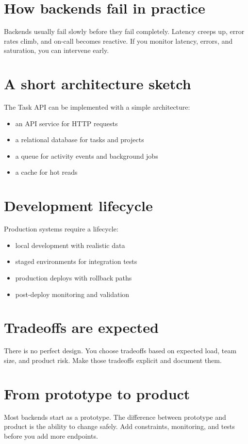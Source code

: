 \section{How backends fail in practice}
Backends usually fail slowly before they fail completely.
Latency creeps up, error rates climb, and on-call becomes reactive.
If you monitor latency, errors, and saturation, you can intervene early.

\section{A short architecture sketch}
The Task API can be implemented with a simple architecture:
\begin{itemize}[nosep]
  \item an API service for HTTP requests
  \item a relational database for tasks and projects
  \item a queue for activity events and background jobs
  \item a cache for hot reads
\end{itemize}

\section{Development lifecycle}
Production systems require a lifecycle:
\begin{itemize}[nosep]
  \item local development with realistic data
  \item staged environments for integration tests
  \item production deploys with rollback paths
  \item post-deploy monitoring and validation
\end{itemize}

\section{Tradeoffs are expected}
There is no perfect design.
You choose tradeoffs based on expected load, team size, and product risk.
Make those tradeoffs explicit and document them.

\section{From prototype to product}
Most backends start as a prototype.
The difference between prototype and product is the ability to change safely.
Add constraints, monitoring, and tests before you add more endpoints.

